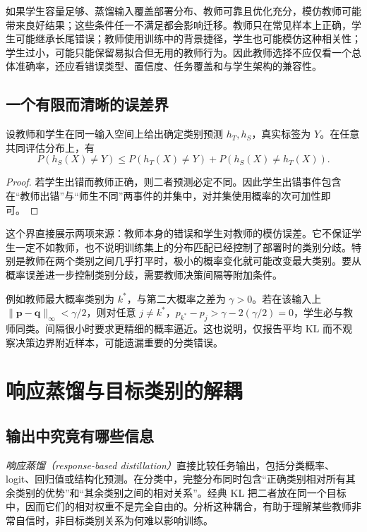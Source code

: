 \documentclass[UTF8,12pt,a4paper,fontset=fandol]{ctexart}
\begin{document}
如果学生容量足够、蒸馏输入覆盖部署分布、教师可靠且优化充分，模仿教师可能带来良好结果；这些条件任一不满足都会影响迁移。教师只在常见样本上正确，学生可能继承长尾错误；教师使用训练中的背景捷径，学生也可能模仿这种相关性；学生过小，可能只能保留易拟合但无用的教师行为。因此教师选择不应仅看一个总体准确率，还应看错误类型、置信度、任务覆盖和与学生架构的兼容性。

\subsection{一个有限而清晰的误差界}
\begin{proposition}[对教师的一致性只能控制一部分错误]
设教师和学生在同一输入空间上给出确定类别预测 $h_T,h_S$，真实标签为 $Y$。在任意共同评估分布上，有
\begin{equation}
 P(h_S(X)\ne Y)\leq P(h_T(X)\ne Y)+P(h_S(X)\ne h_T(X)).
 \label{eq:kd-disagreement-bound}
\end{equation}
\end{proposition}
\begin{proof}
若学生出错而教师正确，则二者预测必定不同。因此学生出错事件包含在“教师出错”与“师生不同”两事件的并集中，对并集使用概率的次可加性即可。
\end{proof}

这个界直接展示两项来源：教师本身的错误和学生对教师的模仿误差。它不保证学生一定不如教师，也不说明训练集上的分布匹配已经控制了部署时的类别分歧。特别是教师在两个类别之间几乎打平时，极小的概率变化就可能改变最大类别。要从概率误差进一步控制类别分歧，需要教师决策间隔等附加条件。

例如教师最大概率类别为 $k^*$，与第二大概率之差为 $\gamma>0$。若在该输入上 $\|\mathbf p-\mathbf q\|_\infty<\gamma/2$，则对任意 $j\ne k^*$，$p_{k^*}-p_j>\gamma-2(\gamma/2)=0$，学生必与教师同类。间隔很小时要求更精细的概率逼近。这也说明，仅报告平均 KL 而不观察决策边界附近样本，可能遗漏重要的分类错误。

\section{响应蒸馏与目标类别的解耦}
\label{sec:kd-response}

\subsection{输出中究竟有哪些信息}
\emph{响应蒸馏（response-based distillation）}直接比较任务输出，包括分类概率、logit、回归值或结构化预测。在分类中，完整分布同时包含“正确类别相对所有其余类别的优势”和“其余类别之间的相对关系”。经典 KL 把二者放在同一个目标中，因而它们的相对权重不是完全自由的。分析这种耦合，有助于理解某些教师非常自信时，非目标类别关系为何难以影响训练。
\end{document}
